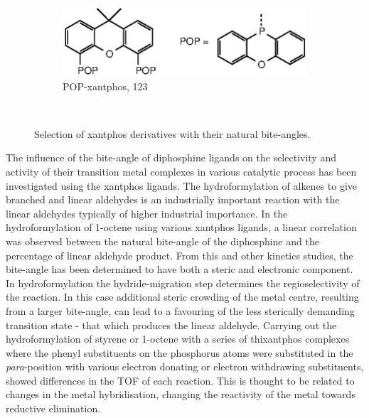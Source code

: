 \begin{figure}[htbp]
~
\begin{subfigure}[b]{0.6\textwidth}
	\centering
	\includegraphics{../Figures/Xantphosderivatives/POP-xantphos.eps}
	\caption{POP-xantphos, 123\degrees}
	\label{POP-xantphos}
\end{subfigure}
\\
\caption[Selection of xantphos derivatives]{Selection of xantphos derivatives with their natural bite-angles.\cite{Dierkes1999, Veen1999, Veen2000, Veen2000b}}
\label{xantphosderivatives}
\end{figure}

The influence of the bite-angle of diphosphine ligands on the selectivity and activity of their transition metal complexes in various catalytic process has been investigated using the xantphos ligands.  The hydroformylation of alkenes to give branched and linear aldehydes is an industrially important reaction with the linear aldehydes typically of higher industrial importance.\cite{Leeuwenbook2000}  In the hydroformylation of 1-octene using various xantphos ligands, a linear correlation was observed between the natural bite-angle of the diphosphine and the percentage of linear aldehyde product.\cite{Kranenburg1995}  From this and other kinetics studies, the bite-angle has been determined to have both a steric and electronic component.\cite{Veen1998, Leeuwen2000}  In hydroformylation the hydride-migration step determines the regioselectivity of the reaction.  In this case additional steric crowding of the metal centre, resulting from a larger bite-angle, can lead to a favouring of the less sterically demanding transition state - that which produces the linear aldehyde.\cite{Freixa2003}  Carrying out the hydroformylation of styrene or 1-octene with a series of thixantphos complexes where the phenyl substituents on the phosphorus atoms were substituted in the \emph{para}-position with various electron donating or electron withdrawing substituents, showed differences in the \gls{TOF} of each reaction.\cite{Veen1998}  This is thought to be related to changes in the metal hybridisation, changing the reactivity of the metal towards reductive elimination.\cite{Slot2002, Freixa2003}


